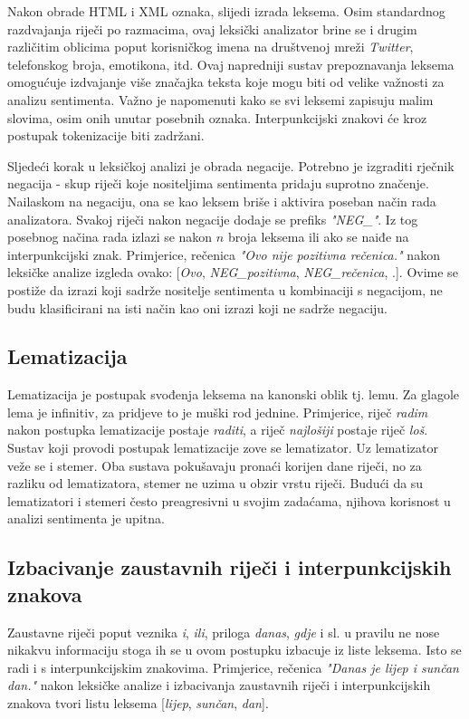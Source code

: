 \documentclass[times, utf8, zavrsni, numeric]{fer}
\begin{document}
\par Nakon obrade HTML i XML oznaka, slijedi izrada leksema.
Osim standardnog razdvajanja riječi po razmacima, ovaj leksički analizator brine se i drugim različitim
oblicima poput korisničkog imena na društvenoj mreži \textit{Twitter}, telefonskog broja, emotikona, itd.
Ovaj napredniji sustav prepoznavanja leksema omogućuje izdvajanje više značajka teksta koje mogu biti 
od velike važnosti za analizu sentimenta.
Važno je napomenuti kako se svi leksemi zapisuju malim slovima, osim onih unutar posebnih oznaka.
Interpunkcijski znakovi će kroz postupak tokenizacije biti zadržani.

\par Sljedeći korak u leksičkoj analizi je obrada negacije. 
Potrebno je izgraditi rječnik negacija - skup riječi koje nositeljima sentimenta pridaju suprotno
značenje.
Nailaskom na negaciju, ona se kao leksem briše i aktivira poseban način rada analizatora.
Svakoj riječi nakon negacije dodaje se prefiks \textit{"NEG\_"}.
Iz tog posebnog načina rada izlazi se nakon $n$ broja leksema ili ako se naiđe na interpunkcijski znak.
Primjerice, rečenica \textit{"Ovo nije pozitivna rečenica."} nakon leksičke analize izgleda ovako:
[\textit{Ovo}, \textit{NEG\_pozitivna}, \textit{NEG\_rečenica}, .].
Ovime se postiže da izrazi koji sadrže nositelje sentimenta u kombinaciji s negacijom, ne budu klasificirani
na isti način kao oni izrazi koji ne sadrže negaciju.

\subsection{Lematizacija}
Lematizacija je postupak svođenja leksema na kanonski oblik tj. lemu.
Za glagole lema je infinitiv, za pridjeve to je muški rod jednine.
Primjerice, riječ \textit{radim} nakon postupka lematizacije postaje \textit{raditi}, a riječ 
\textit{najlošiji} postaje riječ \textit{loš}.
Sustav koji provodi postupak lematizacije zove se lematizator.
Uz lematizator veže se i stemer. 
Oba sustava pokušavaju pronaći korijen dane riječi, no za razliku od lematizatora, stemer ne uzima u 
obzir vrstu riječi.
Budući da su lematizatori i stemeri često preagresivni u svojim zadaćama, njihova korisnost u analizi
sentimenta je upitna.

\subsection{Izbacivanje zaustavnih riječi i interpunkcijskih znakova}
Zaustavne riječi poput veznika \textit{i}, \textit{ili}, priloga \textit{danas}, \textit{gdje} 
i sl. u pravilu ne nose nikakvu informaciju stoga ih se u ovom postupku izbacuje iz liste leksema.
Isto se radi i s interpunkcijskim znakovima.
Primjerice, rečenica \textit{"Danas je lijep i sunčan dan."} nakon leksičke analize i izbacivanja zaustavnih
riječi i interpunkcijskih znakova tvori listu leksema [\textit{lijep}, \textit{sunčan}, \textit{dan}].
\end{document}
